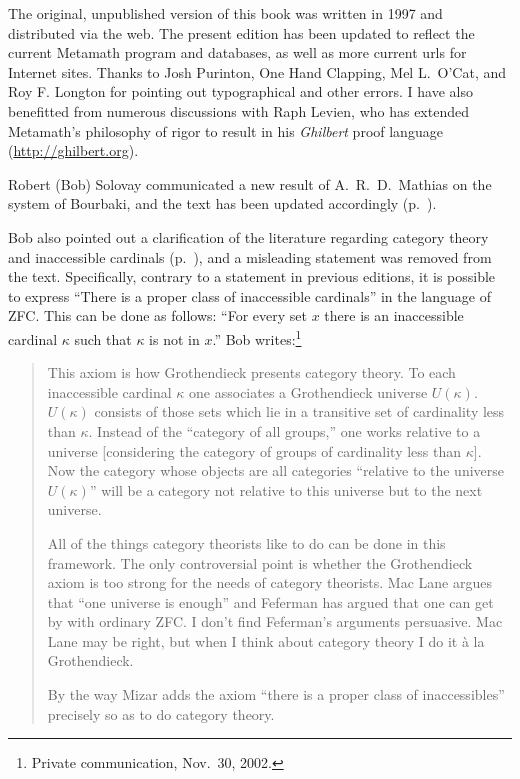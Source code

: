 The original, unpublished version of this book was written in 1997 and
distributed via the web.  The present edition has been updated to
reflect the current Metamath program and databases, as well as more
current {\sc url}s for Internet sites.  Thanks to Josh
Purinton, One Hand
Clapping, Mel L.\ O'Cat, and Roy F. Longton for pointing out
typographical and other errors.  I have also benefitted from numerous
discussions with Raph Levien, who has extended
Metamath's philosophy of rigor to result in his {\em
Ghilbert} proof language (\url{http://ghilbert.org}).

Robert (Bob) Solovay communicated a new result of
A.~R.~D.~Mathias on the system of Bourbaki, and the text has been
updated accordingly (p.~\pageref{bourbaki}).

Bob also pointed out a clarification of the literature regarding
category theory and inaccessible cardinals (p.~\pageref{categoryth}),
and a misleading statement was removed from the text.  Specifically,
contrary to a statement in previous editions, it is possible to express
``There is a proper class of inaccessible cardinals'' in the language of
ZFC.  This can be done as follows:  ``For every set $x$ there is an
inaccessible cardinal $\kappa$ such that $\kappa$ is not in $x$.''
Bob writes:\footnote{Private communication, Nov.~30, 2002.}
\begin{quotation}
     This axiom is how Grothendieck presents category theory.  To each
inaccessible cardinal $\kappa$ one associates a Grothendieck universe
 $U(\kappa)$.  $U(\kappa)$ consists of
those sets which lie in a transitive set of cardinality less than
$\kappa$.  Instead of the ``category of all groups,'' one works relative
to a universe [considering the category of groups of cardinality less
than $\kappa$].  Now the category whose objects are all categories
``relative to the universe $U(\kappa)$'' will be a category not
relative to this universe but to the next universe.

     All of the things category theorists like to do can be done in this
framework.  The only controversial point is whether the Grothen\-dieck
axiom is too strong for the needs of category theorists.  Mac Lane
 argues that ``one universe is enough'' and
Feferman has argued that one can get by with
ordinary ZFC.  I don't find Feferman's arguments persuasive.  Mac Lane
may be right, but when I think about category theory I do it \`{a} la
Grothendieck.

        By the way Mizar adds the axiom ``there is a proper
class of inaccessibles'' precisely so as to do category theory.
\end{quotation}

